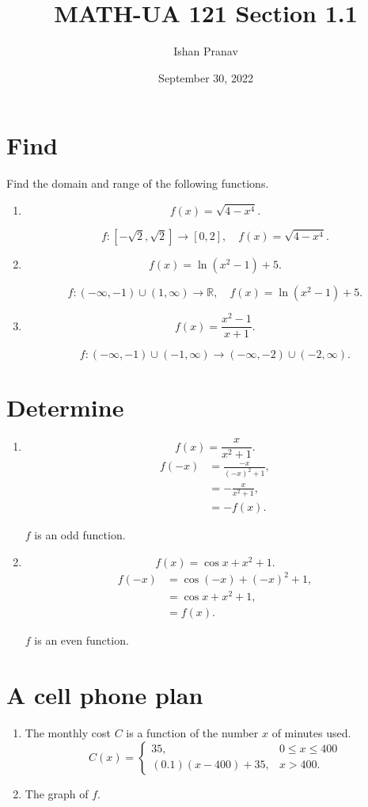 \documentclass[12pt]{article}
\title{MATH-UA 121 Section 1.1}
\author{Ishan Pranav}
\date{September 30, 2022}
\begin{document}
\maketitle
\section{Find}
Find the domain and range of the following functions.
\begin{enumerate}
\item
\[f(x)=\sqrt{4-x^4}.\]

\[f:\left[-\sqrt{2},\sqrt{2}\right]\to[0,2],\quad f(x)=\sqrt{4-x^4}.\]
\item
\[f(x)=\ln(x^2-1)+5.\]

\[f:(-\infty,-1)\cup(1,\infty)\to\mathbb{R},\quad f(x)=\ln(x^2-1)+5.\]
\item
\[f(x)=\frac{x^2-1}{x+1}.\]

\[f:(-\infty,-1)\cup(-1,\infty)\to(-\infty,-2)\cup(-2,\infty).\]
\end{enumerate}
\section{Determine}
\begin{enumerate}
\item
\[f(x)=\frac{x}{x^2+1}.\]
\begin{align*}
    f(-x)
    &=\frac{-x}{(-x)^2+1},\\
    &=-\frac{x}{x^2+1},\\
    &=-f(x).
\end{align*}

$f$ is an odd function.
\item
\[f(x)=\cos{x}+x^2+1.\]
\begin{align*}
    f(-x)
    &=\cos(-x)+(-x)^2+1,\\
    &=\cos{x}+x^2+1,\\
    &=f(x).
\end{align*}

$f$ is an even function.
\end{enumerate}
\section{A cell phone plan}
\begin{enumerate}
\item The monthly cost $C$ is a function of the number $x$ of minutes used.
\[C(x)=\begin{cases}
    35,&0\leq x\leq 400\\
    (0.1)(x-400)+35,&x>400.
\end{cases}\]
\item The graph of $f$.
\begin{center}
\end{center}
\end{enumerate}
\end{document}
